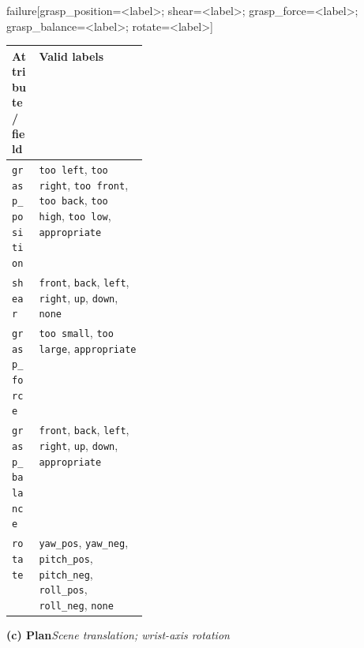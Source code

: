 \begin{table}[t]
\begin{minipage}{\textwidth}
{\footnotesize\ttfamily\raggedright
failure[grasp\_position=<label>; shear=<label>; grasp\_force=<label>;\\
\hspace*{4em}grasp\_balance=<label>; rotate=<label>]\par}
\vspace{5pt}
\setlength{\tabcolsep}{5pt}
\renewcommand{\arraystretch}{1.15}
\begin{tabularx}{\linewidth}{@{}p{0.20\linewidth}>{\raggedright\arraybackslash}X@{}}
\toprule
\textbf{Attribute / field} & \textbf{Valid labels} \\
\midrule
\texttt{grasp\_position} & \texttt{too left}, \texttt{too right}, \texttt{too front}, \texttt{too back}, \texttt{too high}, \texttt{too low}, \texttt{appropriate} \\
\texttt{shear} & \texttt{front}, \texttt{back}, \texttt{left}, \texttt{right}, \texttt{up}, \texttt{down}, \texttt{none} \\
\texttt{grasp\_force} & \texttt{too small}, \texttt{too large}, \texttt{appropriate} \\
\texttt{grasp\_balance} & \texttt{front}, \texttt{back}, \texttt{left}, \texttt{right}, \texttt{up}, \texttt{down}, \texttt{appropriate} \\
\texttt{rotate} & \texttt{yaw\_pos}, \texttt{yaw\_neg}, \texttt{pitch\_pos}, \texttt{pitch\_neg}, \texttt{roll\_pos}, \texttt{roll\_neg}, \texttt{none} \\
\bottomrule
\end{tabularx}
\end{minipage}
\par\vspace{8pt}
\begin{minipage}{\textwidth}
\textbf{(c) Plan}\hfill\textit{Scene translation; wrist-axis rotation}
\vspace{4pt}


\end{minipage}
\end{table}
